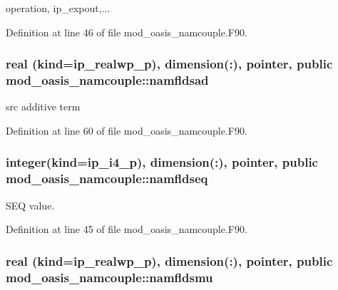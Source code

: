 operation, ip\+\_\+expout,... 



Definition at line 46 of file mod\+\_\+oasis\+\_\+namcouple.\+F90.

\hypertarget{classmod__oasis__namcouple_a1729dba99742412a1e07a479cb7f7921}{
\subsubsection[{namfldsad}]{\setlength{\rightskip}{0pt plus 5cm}real (kind=ip\+\_\+realwp\+\_\+p), dimension(\+:), pointer, public mod\+\_\+oasis\+\_\+namcouple\+::namfldsad}}\label{classmod__oasis__namcouple_a1729dba99742412a1e07a479cb7f7921}


src additive term 



Definition at line 60 of file mod\+\_\+oasis\+\_\+namcouple.\+F90.

\hypertarget{classmod__oasis__namcouple_a54ccfe0380fc1c89d085f37a044a297e}{
\subsubsection[{namfldseq}]{\setlength{\rightskip}{0pt plus 5cm}integer(kind=ip\+\_\+i4\+\_\+p), dimension(\+:), pointer, public mod\+\_\+oasis\+\_\+namcouple\+::namfldseq}}\label{classmod__oasis__namcouple_a54ccfe0380fc1c89d085f37a044a297e}


S\+E\+Q value. 



Definition at line 45 of file mod\+\_\+oasis\+\_\+namcouple.\+F90.

\hypertarget{classmod__oasis__namcouple_ab52824ec91491253e02556a68ab31b09}{
\subsubsection[{namfldsmu}]{\setlength{\rightskip}{0pt plus 5cm}real (kind=ip\+\_\+realwp\+\_\+p), dimension(\+:), pointer, public mod\+\_\+oasis\+\_\+namcouple\+::namfldsmu}}\label{classmod__oasis__namcouple_ab52824ec91491253e02556a68ab31b09}


